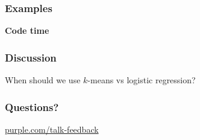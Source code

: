 \begin{frame}
  \frametitle{Examples}

  \vfill
  \centerline{\huge{\bf Code time}}
\end{frame}

\begin{frame}
  \frametitle{Discussion}

  When should we use $k$-means vs logistic regression?
  
\end{frame}

\talksection{\dots}

\begin{frame}
  \frametitle{}


  \cnote{

  }
\end{frame}



\begin{frame}
  \frametitle{Questions?}
  \vspace{3cm}
  \centerline{\large\url{purple.com/talk-feedback}}
\end{frame}


